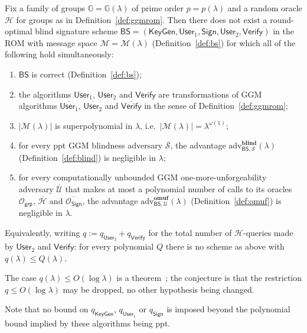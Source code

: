 \documentclass{aicr-conjecture}
\newcommand{\GG}{\mathbb{G}}
\newcommand{\MM}{\mathcal{M}}
\newcommand{\HH}{\mathcal{H}}
\newcommand{\BS}{\mathsf{BS}}
\newcommand{\KeyGen}{\mathsf{KeyGen}}
\newcommand{\Userone}{\mathsf{User}_1}
\newcommand{\Usertwo}{\mathsf{User}_2}
\newcommand{\Sig}{\mathsf{Sign}}
\newcommand{\Ver}{\mathsf{Verify}}
\newcommand{\Ogrp}{\mathcal{O}_{\mathsf{grp}}}
\newcommand{\OSign}{\mathcal{O}_{\mathsf{Sign}}}
\newcommand{\adv}{\mathrm{adv}}
\begin{document}
\begin{conjecture}
\label{conj:main}
Fix a family of groups $\GG=\GG(\lambda)$ of prime order $p=p(\lambda)$
and a random oracle $\HH$ for groups as in
Definition~\ref{def:ggmrom}. Then there does not exist a round-optimal
blind signature scheme $\BS=(\KeyGen,\Userone,\Sig,\Usertwo,\Ver)$ in
the ROM with message space $\MM=\MM(\lambda)$
(Definition~\ref{def:bs}) for which all of the following hold
simultaneously:
\begin{enumerate}
  \item $\BS$ is correct (Definition~\ref{def:bs});
  \item the algorithms $\Userone$, $\Usertwo$ and $\Ver$ are
    transformations of GGM algorithms $\overline{\Userone}$,
    $\overline{\Usertwo}$ and $\overline{\Ver}$ in the sense of
    Definition~\ref{def:ggmrom};
  \item $|\MM(\lambda)|$ is superpolynomial in $\lambda$, i.e.\
    $|\MM(\lambda)|=\lambda^{\omega(1)}$;
  \item for every ppt GGM blindness adversary $\overline{\mathcal{S}}$,
    the advantage $\adv^{\mathbf{blind}}_{\BS,\mathcal{S}}(\lambda)$
    (Definition~\ref{def:blind}) is negligible in $\lambda$;
  \item for every computationally unbounded GGM
    one-more-unforgeability adversary $\overline{\mathcal{U}}$ that
    makes at most a polynomial number of calls to its oracles $\Ogrp$,
    $\overline{\HH}$ and $\overline{\OSign}$, the advantage
    $\adv^{\mathbf{omuf}}_{\BS,\mathcal{U}}(\lambda)$
    (Definition~\ref{def:omuf}) is negligible in $\lambda$.
\end{enumerate}
Equivalently, writing $q:=q_{\Usertwo}+q_{\Ver}$ for the total number of
$\HH$-queries made by $\Usertwo$ and $\Ver$: for every polynomial $Q$
there is no scheme as above with $q(\lambda)\le Q(\lambda)$.
\end{conjecture}

\begin{remark}\label{rem:known}
The case $q(\lambda)\le O(\log\lambda)$ is a theorem~\cite{DKT26}; the
conjecture is that the restriction $q \le O(\log \lambda)$ may be
dropped, no other hypothesis being changed.
\end{remark}

\begin{remark}
\label{rem:unbounded}
Note that no bound on $q_{\KeyGen}$, $q_{\Userone}$ or $q_{\Sig}$ is
imposed beyond the polynomial bound implied by these algorithms being
ppt.
\end{remark}
\end{document}
